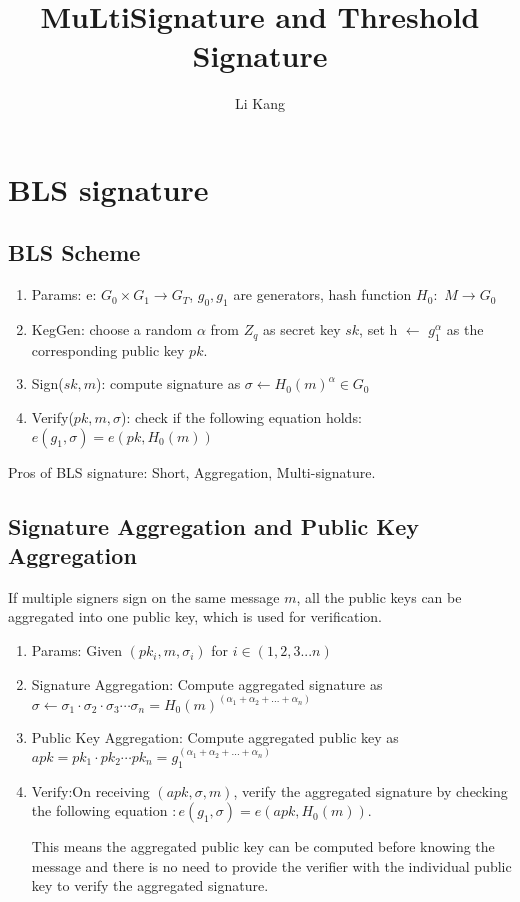 \documentclass[12pt]{report}
\title{MuLtiSignature and Threshold Signature}
\author{Li Kang}
\begin{document}
\section{BLS signature}

\subsection{BLS Scheme}
\begin{enumerate}
	\item{Params}: e: $G_{0} \times G_{1} \rightarrow G_{T}$, $g_0,g_1$ are generators, hash function $H_0:$ $M \rightarrow G_0$ 
	\item{KegGen}: choose a random $\alpha$ from $Z_{q}$ as secret key $sk$, set h $\leftarrow$ $g_{1}^\alpha$ as the corresponding public key $pk$.
	\item{Sign($sk,m$)}: compute signature as $\sigma \leftarrow H_{0}(m)^\alpha \in G_{0}$
	\item{Verify($pk,m,\sigma$)}: check if the following equation holds: $e(g_{1},\sigma) =e(pk, H_{0}(m))$
\end{enumerate}
Pros of BLS signature: Short, Aggregation, Multi-signature.

\subsection{Signature Aggregation and Public Key Aggregation}
If multiple signers sign on the same message $m$, all the public keys can be aggregated into one public key, which is used for verification.
\begin{enumerate}
	\item{Params:} Given $(pk_{i}, m, \sigma_{i})$ for $i \in (1,2,3...n)$
	\item{Signature Aggregation:} Compute aggregated signature as $\sigma \leftarrow \sigma_{1}\cdot\sigma_{2}\cdot\sigma_{3}\cdots\sigma_{n}=H_{0}(m)^{(\alpha_{1}+\alpha_{2}+...+\alpha_{n})}$
	\item{Public Key Aggregation:} Compute aggregated public key as $apk=pk_{1} \cdot pk_{2} \cdots pk_{n}= g_{1}^{(\alpha_{1}+\alpha_{2}+...+\alpha_{n})}$
	\item{Verify:}On receiving $(apk,\sigma,m)$, verify the aggregated signature by checking the following equation $: e(g_{1},\sigma)= e(apk,H_{0}(m))$. 
	
	This means the aggregated public key can be computed before knowing the message and there is no need to provide the verifier with the individual public key to verify the aggregated signature.
\end{enumerate}
\end{document}
